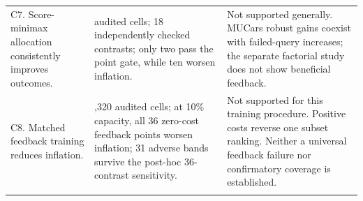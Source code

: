 \documentclass[11pt]{article}
\begin{document}
\begin{longtable}{>{\raggedright\arraybackslash}p{}>{\raggedright\arraybackslash}p{}>{\raggedright\arraybackslash}p{}}
\addlinespace
C7. Score-minimax allocation consistently improves outcomes. & 108 audited cells; 18 independently checked contrasts; only two pass the point gate, while ten worsen inflation. & Not supported generally. MUCars robust gains coexist with failed-query increases; the separate factorial study does not show beneficial feedback.\\
\addlinespace
C8. Matched feedback training reduces inflation. & 4,320 audited cells; at 10\% capacity, all 36 zero-cost feedback points worsen inflation; 31 adverse bands survive the post-hoc 36-contrast sensitivity. & Not supported for this training procedure. Positive costs reverse one subset ranking. Neither a universal feedback failure nor confirmatory coverage is established.\\
\addlinespace
\bottomrule
\end{longtable}
\normalsize
\end{document}
